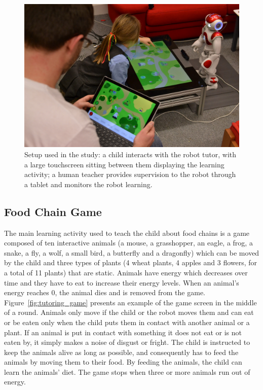 \begin{figure}[ht]
	\centering
	\includegraphics[width=1\textwidth]{setup.jpg}
	\caption{Setup used in the study: a child interacts with the robot tutor, with a large touchscreen sitting between them displaying the learning activity; a human teacher provides supervision to the robot through a tablet and monitors the robot learning.}
	\label{fig:tutoring_setup}
\end{figure}

\subsection{Food Chain Game}

The main learning activity used to teach the child about food chains is a game composed of ten interactive animals (a mouse, a grasshopper, an eagle, a frog, a snake, a fly, a wolf, a small bird, a butterfly and a dragonfly) which can be moved by the child and three types of plants (4 wheat plants, 4 apples and 3 flowers, for a total of 11 plants) that are static. Animals have energy which decreases over time and they have to eat to increase their energy levels. When an animal's energy reaches 0, the animal dies and is removed from the game. Figure~\ref{fig:tutoring_game} presents an example of the game screen in the middle of a round. Animals only move if the child or the robot moves them and can eat or be eaten only when the child puts them in contact with another animal or a plant. If an animal is put in contact with something it does not eat or is not eaten by, it simply makes a noise of disgust or fright. The child is instructed to keep the animals alive as long as possible, and consequently has to feed the animals by moving them to their food. By feeding the animals, the child can learn the animals' diet. The game stops when three or more animals run out of energy.

